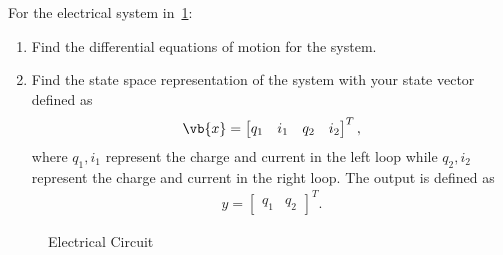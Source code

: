 \documentclass[titlepage, 11pt, reqno]{article}    %
\begin{document}
For the electrical system in~\cref{fig:elec_circuit_2}:
\begin{enumerate}
    \item Find the differential equations of motion for the system.
    \item Find the state space representation of the system with your state vector defined as
        \begin{align*}
        \vb{x} = \begin{bmatrix}q_1 & i_1 & q_2 & i_2\end{bmatrix}^T,
        \end{align*}
        where \(q_1, i_1\) represent the charge and current in the left loop while \(q_2, i_2\) represent the charge and current in the right loop. 
        The output is defined as
        \begin{align*}
        y = \begin{bmatrix} q_1 & q_2 \end{bmatrix}^T.
        \end{align*}
\end{enumerate}
\begin{figure}[htbp]
\centering
\begin{scaletikzpicturetowidth}{0.8\textwidth}
\end{scaletikzpicturetowidth}
\caption{Electrical Circuit~\label{fig:elec_circuit_2}}
\end{figure}
\clearpage
\newpage
\mbox{}
\clearpage
\end{document}

